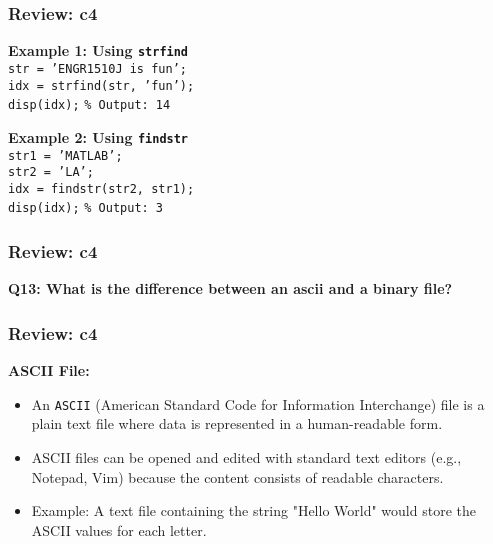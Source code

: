 \documentclass[
	11pt, %
]{beamer}
\begin{document}

\begin{frame}
	\frametitle{Review: c4}

    \textbf{Example 1: Using \texttt{strfind}} \\
    \texttt{str = 'ENGR1510J is fun';} \\
    \texttt{idx = strfind(str, 'fun');} \\
    \texttt{disp(idx);} \texttt{\% Output: 14} \\

    \vspace{0.5cm}
    
    \textbf{Example 2: Using \texttt{findstr}} \\
    \texttt{str1 = 'MATLAB';} \\
    \texttt{str2 = 'LA';} \\
    \texttt{idx = findstr(str2, str1);} \\
    \texttt{disp(idx);} 
    \texttt{\% Output: 3}\\

\end{frame}


\begin{frame}
	\frametitle{Review: c4}

	\textbf{Q13: What is the difference between an ascii and a binary file?}

\end{frame}


\begin{frame}
	\frametitle{Review: c4}

    \textbf{ASCII File:}
    \begin{itemize}
        \item An \texttt{ASCII} (American Standard Code for Information Interchange) file is a plain text file where data is represented in a human-readable form.
        
        \item ASCII files can be opened and edited with standard text editors (e.g., Notepad, Vim) because the content consists of readable characters.
        
        \item Example: A text file containing the string "Hello World" would store the ASCII values for each letter.
    \end{itemize}


\end{frame}
\end{document}
